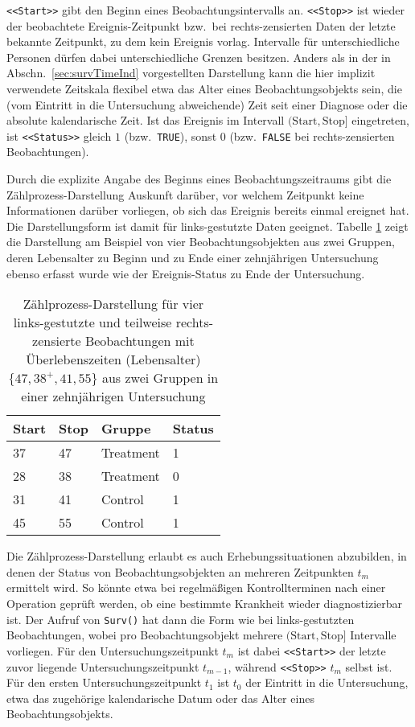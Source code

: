 \lstinline!<<Start>>! gibt den Beginn eines Beobachtungsintervalls an. \lstinline!<<Stop>>! ist wieder der beobachtete Ereignis-Zeitpunkt bzw.\ bei rechts-zensierten Daten der letzte bekannte Zeitpunkt, zu dem kein Ereignis vorlag. Intervalle für unterschiedliche Personen dürfen dabei unterschiedliche Grenzen besitzen. Anders als in der in Abschn.\ \ref{sec:survTimeInd} vorgestellten Darstellung kann die hier implizit verwendete Zeitskala flexibel etwa das Alter eines Beobachtungsobjekts sein, die (vom Eintritt in die Untersuchung abweichende) Zeit seit einer Diagnose oder die absolute kalendarische Zeit. Ist das Ereignis im Intervall $(\text{Start}, \text{Stop}]$ eingetreten, ist \lstinline!<<Status>>! gleich $1$ (bzw.\ \lstinline!TRUE!), sonst $0$ (bzw.\ \lstinline!FALSE! bei rechts-zensierten Beobachtungen).

Durch die explizite Angabe des Beginns eines Beobachtungszeitraums gibt die Zählprozess-Darstellung Auskunft darüber, vor welchem Zeitpunkt keine Informationen darüber vorliegen, ob sich das Ereignis bereits einmal ereignet hat. Die Darstellungsform ist damit für links-gestutzte Daten geeignet. Tabelle \ref{tab:survLeftCens} zeigt die Darstellung am Beispiel von vier Beobachtungsobjekten aus zwei Gruppen, deren Lebensalter zu Beginn und zu Ende einer zehnjährigen Untersuchung ebenso erfasst wurde wie der Ereignis-Status zu Ende der Untersuchung.

\begin{table}[ht]
\centering
\caption{Zählprozess-Darstellung für vier links-gestutzte und teilweise rechts-zensierte Beobachtungen mit Überlebenszeiten (Lebensalter) $\{47, 38^{+}, 41, 55\}$ aus zwei Gruppen in einer zehnjährigen Untersuchung}
\label{tab:survLeftCens}
\begin{tabular}{llll}
\hline
\sffamily Start & \sffamily Stop & \sffamily Gruppe & \sffamily Status\\\hline\hline
37              & 47             & Treatment        & 1 \\
28              & 38             & Treatment        & 0 \\
31              & 41             & Control          & 1 \\
45              & 55             & Control          & 1 \\\hline
\end{tabular}
\end{table}

Die Zählprozess-Darstellung erlaubt es auch Erhebungssituationen abzubilden, in denen der Status von Beobachtungsobjekten
an mehreren Zeitpunkten $t_{m}$ ermittelt wird. So könnte etwa bei regelmäßigen Kontrollterminen nach einer Operation geprüft werden, ob eine bestimmte Krankheit wieder diagnostizierbar ist. Der Aufruf von \lstinline!Surv()! hat dann die Form wie bei links-gestutzten Beobachtungen, wobei pro Beobachtungsobjekt mehrere $(\text{Start}, \text{Stop}]$ Intervalle vorliegen. Für den Untersuchungszeitpunkt $t_{m}$ ist dabei \lstinline!<<Start>>! der letzte zuvor liegende Untersuchungszeitpunkt $t_{m-1}$, während \lstinline!<<Stop>>! $t_{m}$ selbst ist. Für den ersten Untersuchungszeitpunkt $t_{1}$ ist $t_{0}$ der Eintritt in die Untersuchung, etwa das zugehörige kalendarische Datum oder das Alter eines Beobachtungsobjekts.

